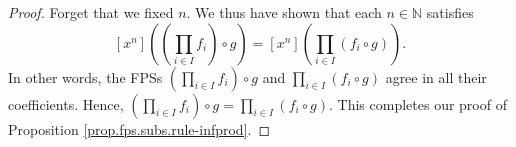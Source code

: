\begin{fineprint}
\begin{proof}
Forget that we fixed $n$. We thus have shown that each $n\in\mathbb{N}$
satisfies%
\[
\left[  x^{n}\right]  \left(  \left(  \prod_{i\in I}f_{i}\right)  \circ
g\right)  =\left[  x^{n}\right]  \left(  \prod_{i\in I}\left(  f_{i}\circ
g\right)  \right)  .
\]
In other words, the FPSs $\left(  \prod_{i\in I}f_{i}\right)  \circ g$ and
$\prod_{i\in I}\left(  f_{i}\circ g\right)  $ agree in all their coefficients.
Hence, $\left(  \prod_{i\in I}f_{i}\right)  \circ g=\prod_{i\in I}\left(
f_{i}\circ g\right)  $. This completes our proof of Proposition
\ref{prop.fps.subs.rule-infprod}.
\end{proof}
\end{fineprint}
